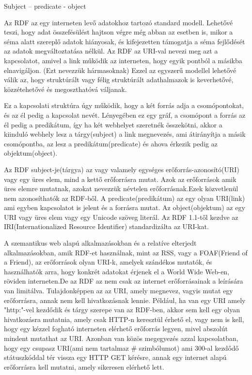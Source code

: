 

Subject – predicate  - object

Az RDF az egy interneten levő adatokhoz tartozó standard modell. Lehetővé teszi, hogy adat összefésülést hajtson végre még abban az esetben is, mikor a séma alatt szereplő adatok hiányosak, és kifejezetten támogatja a séma fejlődését az adatok megváltoztatása nélkül.
Az RDF az URI-val nevezi meg azt a kapcsolatot, amivel a link működik az interneten, hogy egyik pontból a másikba elnavigáljon. (Ezt nevezzük hármasoknak) Ezzel az egyszerű modellel lehetővé válik az, hogy struktúrált vagy félig struktúrált adathalmazok is keverhetővé, közzétehetővé és megoszthatóvá váljanak.

Ez a kapcsolati struktúra úgy működik, hogy a két forrás adja a csomópontokat, és az él pedig a kapcsolat nevét. Lényegében ez egy gráf, a csomópont a forrás az él pedig a predikátum, így ha két webhelyet szeretnék összekötni, akkor a kiinduló webhely lesz a tárgy(subject) a link megnevezés, ami átirányítja a másik csomópontba, az lesz a predikátum(predicate) és ahova érkezik pedig az objektum(object).

Az RDF subject-je(tárgya) az vagy valamely egységes erőforrás-azonosító(URI) vagy egy üres elem, mind a kettő erőforrásra mutat. Azok az erőforrások amik üres elemre mutatnak, azokat nevezzük névtelen erőforrásnak.Ezek közvetlenül nem azonosíthatók az RDF-ből. A predicate(predikátum) az egy olyan URI(link) ami egyben kapcsolatot is jelent és a forrásra mutat. Az object(objektum) az egy URI vagy üres elem vagy egy Unicode szöveg literál. Az RDF 1.1-től kezdve az IRI(Internationalized Resource Identifier) standardizálta az URI-kat.

A szemantikus web alapú alkalmazásokban és a relatíve elterjedt alkalmazásokban, amik RDF-et használnak, mint az RSS, vagy a FOAF(Friend of a Friend), az erőforrások olyan URI-k, amelyek szándékos mutatók, és használhatók arra, hogy konkrét adatokat érjenek el a World Wide Web-en, röviden interneten.De az RDF az nem csak az internet erőforrásainak a leírására van limitálva. Tulajdonképpen az az URI, amely megnevez, vagyis mutat egy erőforrásra, annak nem kell hivatkozásnak lennie. Például, ha van egy URI amely "http:"-vel kezdődik és tárgy szerepe van az RDF-ben, akkor sem kell egy olyan hivatkozásra mutatnia, amely csak HTTP-n keresztül érhető el, vagy nem is kell, hogy egy kézzel fogható interneten elérhető erőforrás legyen, mivel abszolút mindent mutathat az URI. Azonban van közös megegyezés azzal kapcsolatban, hogy egy csupasz URI(ami nem tartalmaz \# szimbólumot) ami 300-al kezdődő státuszkóddal tér vissza egy HTTP GET kérésre, annak egy internet alapú erőforrásra kell mutatni, amely sikeresen elérhető lett.


